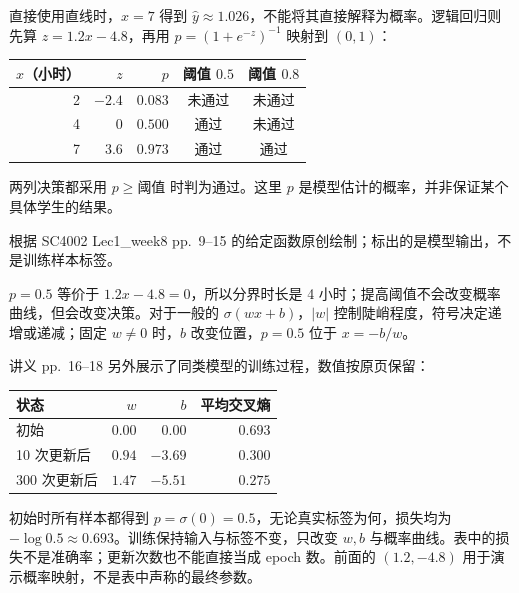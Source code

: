 \begin{workedsolution}
直接使用直线时，$x=7$ 得到 $\hat y\approx1.026$，不能将其直接解释为概率。逻辑回归则先算 $z=1.2x-4.8$，再用 $p=(1+e^{-z})^{-1}$ 映射到 $(0,1)$：

\begin{center}
\begin{tabular}{@{}r r r c c@{}}
\toprule
$x$（小时） & $z$ & $p$ & 阈值 $0.5$ & 阈值 $0.8$ \\
\midrule
2 & $-2.4$ & $0.083$ & 未通过 & 未通过 \\
4 & $0$ & $0.500$ & 通过 & 未通过 \\
7 & $3.6$ & $0.973$ & 通过 & 通过 \\
\bottomrule
\end{tabular}
\end{center}

两列决策都采用 $p\ge\text{阈值}$ 时判为通过。这里 $p$ 是模型估计的概率，并非保证某个具体学生的结果。

\begin{center}


{\small 根据 SC4002 Lec1\_week8 pp.~9--15 的给定函数原创绘制；标出的是模型输出，不是训练样本标签。}
\end{center}

$p=0.5$ 等价于 $1.2x-4.8=0$，所以分界时长是 4 小时；提高阈值不会改变概率曲线，但会改变决策。对于一般的 $\sigma(wx+b)$，$|w|$ 控制陡峭程度，符号决定递增或递减；固定 $w\ne0$ 时，$b$ 改变位置，$p=0.5$ 位于 $x=-b/w$。

讲义 pp.~16--18 另外展示了同类模型的训练过程，数值按原页保留：
\begin{center}
\begin{tabular}{@{}l r r r@{}}
\toprule
状态 & $w$ & $b$ & 平均交叉熵 \\
\midrule
初始 & $0.00$ & $0.00$ & $0.693$ \\
10 次更新后 & $0.94$ & $-3.69$ & $0.300$ \\
300 次更新后 & $1.47$ & $-5.51$ & $0.275$ \\
\bottomrule
\end{tabular}
\end{center}
初始时所有样本都得到 $p=\sigma(0)=0.5$，无论真实标签为何，损失均为 $-\log0.5\approx0.693$。训练保持输入与标签不变，只改变 $w,b$ 与概率曲线。表中的损失不是准确率；更新次数也不能直接当成 epoch 数。前面的 $(1.2,-4.8)$ 用于演示概率映射，不是表中声称的最终参数。
\end{workedsolution}

